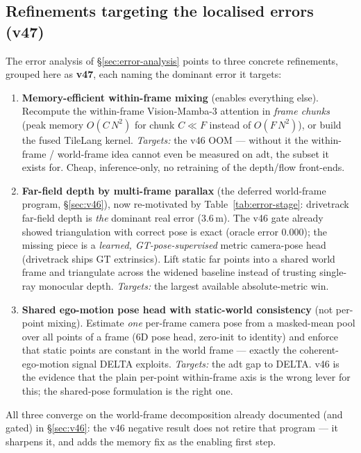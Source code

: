 \documentclass[11pt,a4paper]{article}
\begin{document}
\subsection{Refinements targeting the localised errors (v47)}
\label{sec:v47}
The error analysis of \S\ref{sec:error-analysis} points to three concrete refinements, grouped here as
\textbf{v47}, each naming the dominant error it targets:
\begin{enumerate}
  \item \textbf{Memory-efficient within-frame mixing} (enables everything else). Recompute the within-frame
  Vision-Mamba-3 attention in \emph{frame chunks} (peak memory $O(C\,N^{2})$ for chunk $C\!\ll\!F$ instead of
  $O(F\,N^{2})$), or build the fused TileLang kernel. \emph{Targets:} the v46 OOM --- without it the
  within-frame / world-frame idea cannot even be measured on adt, the subset it exists for. Cheap,
  inference-only, no retraining of the depth/flow front-ends.
  \item \textbf{Far-field depth by multi-frame parallax} (the deferred world-frame program,
  \S\ref{sec:v46}), now re-motivated by Table~\ref{tab:error-stage}: drivetrack far-field depth is
  \emph{the} dominant real error ($3.6$\,m). The v46 gate already showed triangulation with correct pose is
  exact (oracle error $0.000$); the missing piece is a \emph{learned, GT-pose-supervised} metric camera-pose
  head (drivetrack ships GT extrinsics). Lift static far points into a shared world frame and triangulate
  across the widened baseline instead of trusting single-ray monocular depth. \emph{Targets:} the largest
  available absolute-metric win.
  \item \textbf{Shared ego-motion pose head with static-world consistency} (not per-point mixing).
  Estimate \emph{one} per-frame camera pose from a masked-mean pool over all points of a frame ($6$D pose
  head, zero-init to identity) and enforce that static points are constant in the world frame --- exactly the
  coherent-ego-motion signal DELTA exploits. \emph{Targets:} the adt gap to DELTA. v46 is the evidence that
  the plain per-point within-frame axis is the wrong lever for this; the shared-pose formulation is the
  right one.
\end{enumerate}
All three converge on the world-frame decomposition already documented (and gated) in \S\ref{sec:v46}: the
v46 negative result does not retire that program --- it sharpens it, and adds the memory fix as the enabling
first step.
\end{document}
